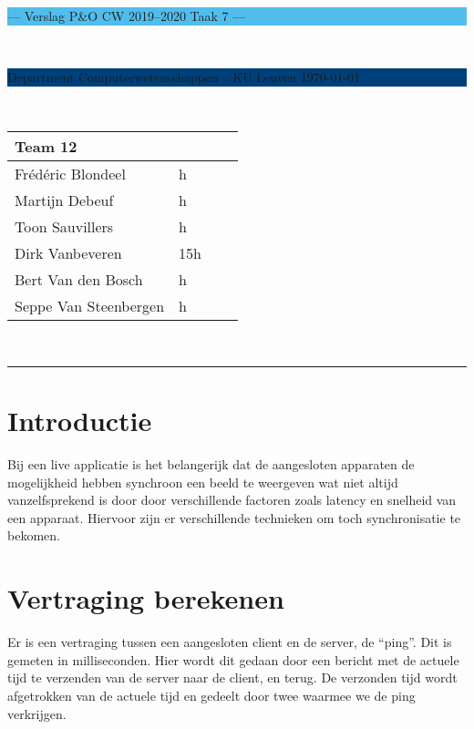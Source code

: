 \documentclass[a4paper,11pt]{article}
\begin{document}
\noindent
\colorbox[HTML]{52BDEC}{\bfseries\parbox{\textwidth}{\centering\large
  --- Verslag P\&O CW 2019--2020 Taak 7 ---
}}
\\[-1mm]
\colorbox[HTML]{00407A}{\bfseries\color{white}\parbox{\textwidth}{
  Department Computerwetenschappen -- KU Leuven
  \hfill
  \today
}}
\\

\smallskip

\noindent

\begin{tabular}{*4l}
\toprule
\multicolumn{2}{l}{\large\textbf{Team 12}} \\
\midrule
Frédéric Blondeel & h \\
Martijn Debeuf & h \\
Toon Sauvillers & h \\ %
Dirk Vanbeveren & 15h \\
Bert Van den Bosch & h \\
Seppe Van Steenbergen & h \\


\bottomrule
\hline
\end{tabular}\\

\noindent
{\color[HTML]{52BDEC} \rule{\linewidth}{1mm} }
\tableofcontents
\newpage
\section{Introductie}\label{sec:introductie}

Bij een live applicatie is het belangerijk dat de aangesloten apparaten de mogelijkheid hebben synchroon een beeld te weergeven wat niet altijd vanzelfsprekend is door door verschillende factoren zoals latency en snelheid van een apparaat. Hiervoor zijn er verschillende technieken om toch synchronisatie te bekomen.

\section{Vertraging berekenen}
Er is een vertraging tussen een aangesloten client en de server, de “ping”. Dit is gemeten in milliseconden.
Hier wordt dit gedaan door een bericht met de actuele tijd te verzenden van de server naar de client, en terug. De verzonden tijd wordt afgetrokken van de actuele tijd en gedeelt door twee waarmee we de ping verkrijgen.
\end{document}
